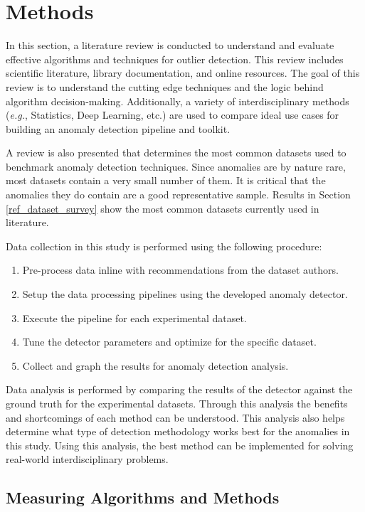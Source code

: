 \section{Methods}
\label{ref_methods}

In this section, a literature review is conducted to understand and evaluate effective algorithms and techniques for outlier detection.
This review includes scientific literature, library documentation, and online resources.
The goal of this review is to understand the cutting edge techniques and the logic behind algorithm decision-making.
Additionally, a variety of interdisciplinary methods (\textit{e.g.}, Statistics, Deep Learning, etc.) are used to compare ideal use cases for building an anomaly detection pipeline and toolkit.

A review is also presented that determines the most common datasets used to benchmark anomaly detection techniques.
Since anomalies are by nature rare, most datasets contain a very small number of them.
It is critical that the anomalies they do contain are a good representative sample.
Results in Section \ref{ref_dataset_survey} show the most common datasets currently used in literature.

Data collection in this study is performed using the following procedure:
\begin{enumerate}
    \item Pre-process data inline with recommendations from the dataset authors.
    \item Setup the data processing pipelines using the developed anomaly detector.
    \item Execute the pipeline for each experimental dataset.
    \item Tune the detector parameters and optimize for the specific dataset.
    \item Collect and graph the results for anomaly detection analysis.
\end{enumerate}

Data analysis is performed by comparing the results of the detector against the ground truth for the experimental datasets.
Through this analysis the benefits and shortcomings of each method can be understood.
This analysis also helps determine what type of detection methodology works best for the anomalies in this study.
Using this analysis, the best method can be implemented for solving real-world interdisciplinary problems.

\subsection{Measuring Algorithms and Methods}

